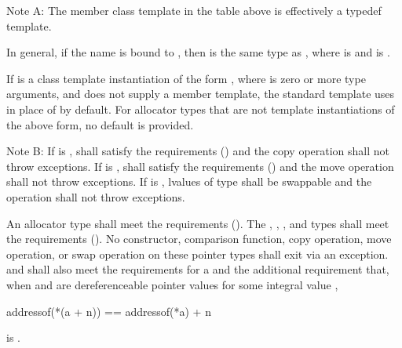 \pnum
Note A: The member class template  in the table above is
effectively a typedef template. \begin{note} In general, if
the name  is bound to , then
 is the same type as
, where
 is  and
 is . \end{note} If
 is a class template instantiation of the form
, where  is zero or more type
arguments, and  does not supply a  member
template, the standard  template uses
 in place of 
by default. For allocator types that are not template instantiations of the
above form, no default is provided.

\pnum
Note B:
If  is ,
 shall satisfy the
 requirements ()
and the copy operation shall not throw exceptions.
If  is ,
 shall satisfy the
 requirements ()
and the move operation shall not throw exceptions.
If  is ,
lvalues of type  shall be swappable
and the  operation shall not throw exceptions.

\pnum
An allocator type  shall meet the
 requirements ().
The , , , and
 types shall meet the
 requirements ().
No constructor,
comparison function, copy operation, move operation, or swap operation on
these pointer types shall exit via an exception.  and  shall also
meet the requirements for
a  and
the additional requirement that, when  and  are
dereferenceable pointer values for some integral value ,
\begin{codeblock}
addressof(*(a + n)) == addressof(*a) + n
\end{codeblock}
is .

